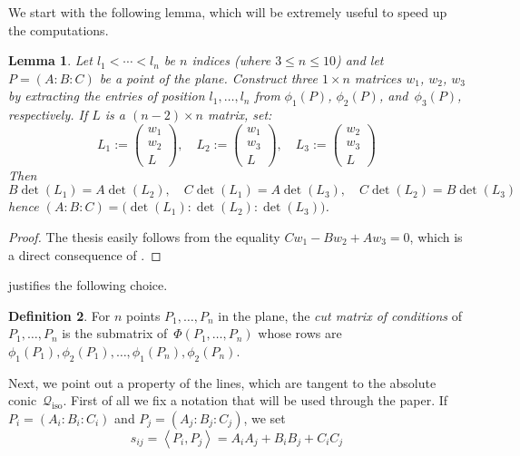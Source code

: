 \documentclass{amsart}
\theoremstyle{plain}
\newtheorem{lemma}{Lemma}[section]
\theoremstyle{definition}
\newtheorem{definition}[lemma]{Definition}
\newcommand{\iso}{\mathcal{Q}_{\mathrm{iso}}}
\newcommand{\scl}[2]{\left\langle {#1}, {#2} \right\rangle}
\begin{document}
We start with the following lemma, which will be extremely useful
to speed up the computations.

\begin{lemma}
\label{lemma:minors}
Let $l_1 < \cdots <l_n$ be $n$ indices (where $3 \leq n \leq 10$) and let $P = (A: B: C)$ be a point of the plane.
Construct three $1 \times n$ matrices $w_1$, $w_2$, $w_3$ by extracting the entries of position $l_1, \dotsc, l_n$ from $\phi_1(P)$, $\phi_2(P)$, and~$\phi_3(P)$, respectively. If $L$ is a $(n-2) \times n$ matrix, set:
  \[
  L_1 := \left(\begin{array}{c}w_1 \\ w_2 \\ L\end{array} \right), \quad
  L_2 := \left(\begin{array}{c}w_1 \\ w_3 \\ L\end{array} \right), \quad
  L_3 := \left(\begin{array}{c}w_2 \\ w_3 \\ L\end{array} \right)
  \]
  Then
  \[
  B \det(L_1) = A \det(L_2), \quad
  C \det(L_1) = A \det(L_3), \quad
  C \det(L_2) = B \det(L_3)
  \]
  hence $(A: B: C) = \bigl( \det(L_1): \det(L_2): \det(L_3) \bigr)$.
\end{lemma}
\begin{proof}
  The thesis easily follows from the equality $C w_1 - B w_2 + A w_3 = 0$, which is a direct consequence of .
\end{proof}

 justifies the following choice.

\begin{definition}
 \label{definition:reduced_matrix_conditions}
 For $n$ points $P_1, \dotsc, P_n$ in the plane, the \emph{cut matrix of conditions} of $P_1, \dotsc, P_n$ is the submatrix of~$\Phi(P_1, \dotsc, P_n)$ whose rows are $\phi_1(P_1), \phi_2(P_1), \dotsc, \phi_1(P_n), \phi_2(P_n)$.
\end{definition}

Next, we point out a property of the lines, which are tangent to the absolute conic~$\iso$.
First of all we fix a notation that will be used through the paper. If
$P_i = (A_i: B_i: C_i)$ and $P_j = (A_j: B_j: C_j)$, we set
\[
s_{ij} = \scl{P_i}{P_j} = A_i A_j + B_i B_j + C_i C_j
\]
\end{document}
